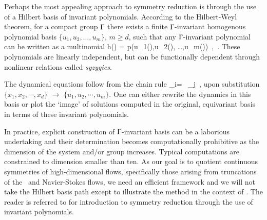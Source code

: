 Perhaps the most appealing approach to symmetry reduction is
through the use of a Hilbert basis of invariant polynomials.
According to the Hilbert-Weyl theorem, 
for a compact group $\Gamma$ there exists a finite
$\Gamma${-invariant} homogenous polynomial basis
$\{u_1,u_2, \dots,u_m\}$, $ m \geq d$,
such that any $\Gamma${-invariant} polynomial
can be written as a multinomial
\beq
h(\ssp) = p(u_1(\ssp),u_2(\ssp), \dots,u_m(\ssp))
    \,,\qquad \ssp \in \pS
\,.
These polynomials are linearly
independent, but can be functionally dependent through
nonlinear relations called \emph{syzygies}.

The dynamical
equations follow from the chain rule
\beq
 _i= \, _j
 \,,
upon substitution
$\{x_1,x_2,\cdots,x_d\}$ $\to$ $\{u_1,u_2,\cdots,u_m\}$.
One can either rewrite the dynamics in this basis or
plot the `image' of solutions computed in the original, equivariant
basis in terms of these invariant polynomials.


In practice, explicit construction of $\Gamma${-invariant} basis
can be a laborious undertaking and their determination becomes 
computationally prohibitive as the dimension of the system and/or group
increases. Typical
computations are constrained to dimension smaller than ten.
As our goal is to quotient continuous symmetries of
high-dimensional flows, specifically those arising from
truncations of the \KS\ and Navier-Stokes flows, 
we need an efficient framework and we will not take the Hilbert basis 
path except to illustrate the method in the context of \cLe.
The reader is referred to 
for introduction to symmetry reduction through
the use of invariant polynomials.
